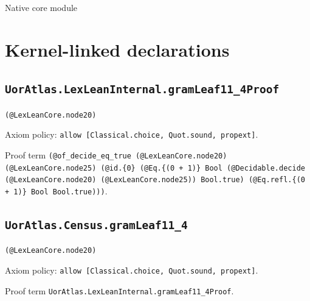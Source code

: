 \documentclass[11pt]{article}
\begin{document}
\begin{center}{\LARGE Native core module}\end{center}
\section*{Kernel-linked declarations}
\subsection*{\texttt{UorAtlas.LexLeanInternal.gramLeaf11\_4Proof}}
\noindent\texttt{(@LexLeanCore.node20)}\par
\noindent Axiom policy: \texttt{allow [Classical.choice, Quot.sound, propext]}.\par
\noindent Proof term \texttt{(@of\_decide\_eq\_true (@LexLeanCore.node20) (@LexLeanCore.node25) (@id.\{0\} (@Eq.\{(0 + 1)\} Bool (@Decidable.decide (@LexLeanCore.node20) (@LexLeanCore.node25)) Bool.true) (@Eq.refl.\{(0 + 1)\} Bool Bool.true)))}.\par
\subsection*{\texttt{UorAtlas.Census.gramLeaf11\_4}}
\noindent\texttt{(@LexLeanCore.node20)}\par
\noindent Axiom policy: \texttt{allow [Classical.choice, Quot.sound, propext]}.\par
\noindent Proof term \texttt{UorAtlas.LexLeanInternal.gramLeaf11\_4Proof}.\par
\end{document}
